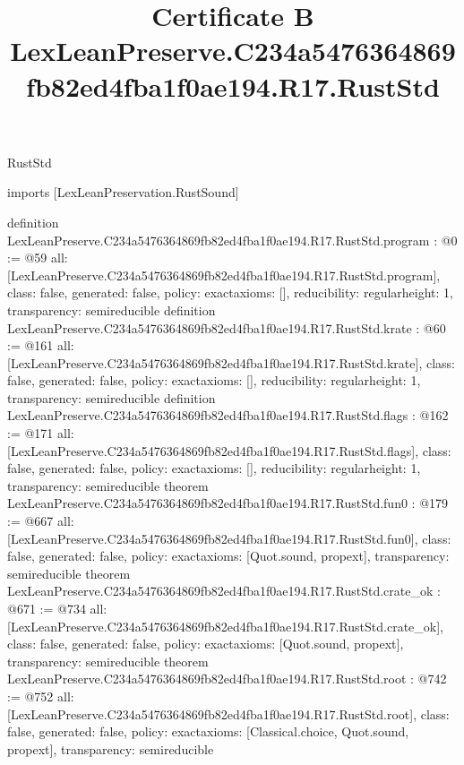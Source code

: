 \begin{lexlean}{RustStd}
\title{Certificate B LexLeanPreserve.C234a5476364869fb82ed4fba1f0ae194.R17.RustStd}
\begin{coremodule}
imports [LexLeanPreservation.RustSound]

definition LexLeanPreserve.C234a5476364869fb82ed4fba1f0ae194.R17.RustStd.program : @0 := @59 {
  all: [LexLeanPreserve.C234a5476364869fb82ed4fba1f0ae194.R17.RustStd.program],
  class: false,
  generated: false,
  policy: exact{axioms: []},
  reducibility: regular{height: 1},
  transparency: semireducible
}
definition LexLeanPreserve.C234a5476364869fb82ed4fba1f0ae194.R17.RustStd.krate : @60 := @161 {
  all: [LexLeanPreserve.C234a5476364869fb82ed4fba1f0ae194.R17.RustStd.krate],
  class: false,
  generated: false,
  policy: exact{axioms: []},
  reducibility: regular{height: 1},
  transparency: semireducible
}
definition LexLeanPreserve.C234a5476364869fb82ed4fba1f0ae194.R17.RustStd.flags : @162 := @171 {
  all: [LexLeanPreserve.C234a5476364869fb82ed4fba1f0ae194.R17.RustStd.flags],
  class: false,
  generated: false,
  policy: exact{axioms: []},
  reducibility: regular{height: 1},
  transparency: semireducible
}
theorem LexLeanPreserve.C234a5476364869fb82ed4fba1f0ae194.R17.RustStd.fun0 : @179 := @667 {
  all: [LexLeanPreserve.C234a5476364869fb82ed4fba1f0ae194.R17.RustStd.fun0],
  class: false,
  generated: false,
  policy: exact{axioms: [Quot.sound, propext]},
  transparency: semireducible
}
theorem LexLeanPreserve.C234a5476364869fb82ed4fba1f0ae194.R17.RustStd.crate_ok : @671 := @734 {
  all: [LexLeanPreserve.C234a5476364869fb82ed4fba1f0ae194.R17.RustStd.crate_ok],
  class: false,
  generated: false,
  policy: exact{axioms: [Quot.sound, propext]},
  transparency: semireducible
}
theorem LexLeanPreserve.C234a5476364869fb82ed4fba1f0ae194.R17.RustStd.root : @742 := @752 {
  all: [LexLeanPreserve.C234a5476364869fb82ed4fba1f0ae194.R17.RustStd.root],
  class: false,
  generated: false,
  policy: exact{axioms: [Classical.choice, Quot.sound, propext]},
  transparency: semireducible
}


\end{coremodule}
\end{lexlean}

